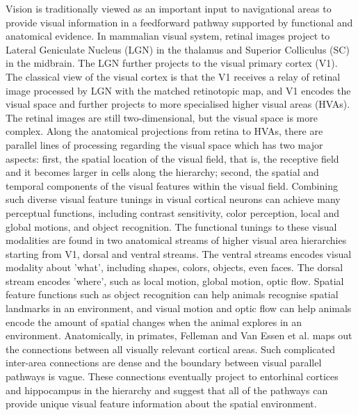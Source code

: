 Vision is traditionally viewed as an important input to navigational areas to provide visual information in a feedforward pathway supported by functional and anatomical evidence. In mammalian visual system,  retinal images project to Lateral Geniculate Nucleus (LGN) in the thalamus and Superior Colliculus (SC) in the midbrain. The LGN further projects to the visual primary cortex (V1). The classical view of the visual cortex is that the V1 receives a relay of retinal image processed by LGN with the matched retinotopic map, and V1 encodes the visual space and further projects to more specialised higher visual areas (HVAs). The retinal images are still two-dimensional, but the visual space is more complex. Along the anatomical projections from retina to HVAs, there are parallel lines of processing regarding the visual space which has two major aspects: first, the spatial location of the visual field, that is, the receptive field and it becomes larger in cells along the hierarchy; second, the spatial and temporal components of the visual features within the visual field. Combining such diverse visual feature tunings in visual cortical neurons can achieve many perceptual functions, including contrast sensitivity, color perception, local and global motions, and object recognition. The functional tunings to these visual modalities are found in two anatomical streams of higher visual area hierarchies starting from V1, dorsal and ventral streams. The ventral streams encodes visual modality about 'what', including shapes, colors, objects, even faces. The dorsal stream encodes 'where', such as local motion, global motion, optic flow. Spatial feature functions such as object recognition can help animals recognise spatial landmarks in an environment, and visual motion and optic flow can help animals encode the amount of spatial changes when the animal explores in an environment. Anatomically, in primates, Felleman and Van Essen et al. maps out the connections between all visually relevant cortical areas. Such complicated inter-area connections are dense and the boundary between visual parallel pathways is vague. These connections eventually project to entorhinal cortices and hippocampus in the hierarchy and suggest that all of the pathways can provide unique visual feature information about the spatial environment. 


